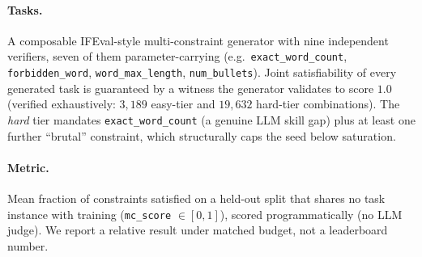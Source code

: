 \paragraph{Tasks.} A composable IFEval-style \citep{zhou2023ifeval}
multi-constraint generator with nine independent verifiers, seven of them parameter-carrying
(e.g.\ \texttt{exact\_word\_count}, \texttt{forbidden\_word},
\texttt{word\_max\_length}, \texttt{num\_bullets}). Joint satisfiability of every
generated task is guaranteed by a witness the generator validates to score
$1.0$ (verified exhaustively: $3{,}189$ easy-tier and $19{,}632$ hard-tier
combinations). The \emph{hard} tier mandates \texttt{exact\_word\_count} (a
genuine LLM skill gap) plus at least one further ``brutal'' constraint, which
structurally caps the seed below saturation.

\paragraph{Metric.} Mean fraction of constraints satisfied on a held-out split that
shares no task instance with training (\texttt{mc\_score} $\in [0,1]$), scored programmatically (no LLM
judge). We report a relative result under matched budget, not a
leaderboard number.

